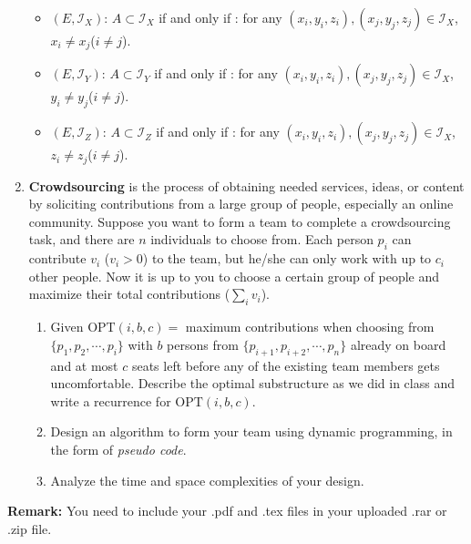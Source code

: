 \documentclass[12pt,a4paper]{article}
\theoremstyle{definition}
\begin{document}
\begin{enumerate}
	\begin{itemize}
		\item $(E, \mathcal{I}_X)$: $A \subset \mathcal{I}_X$ if and only if : for any $(x_i, y_i, z_i), (x_j, y_j, z_j) \in \mathcal{I}_X$, $x_i \neq x_j$($i \neq j$).
	\end{itemize}

	\begin{itemize}
		\item $(E, \mathcal{I}_Y)$: $A \subset \mathcal{I}_Y$ if and only if : for any $(x_i, y_i, z_i), (x_j, y_j, z_j) \in \mathcal{I}_X$, $y_i \neq y_j$($i \neq j$).
	\end{itemize}

	\begin{itemize}
		\item $(E, \mathcal{I}_Z)$: $A \subset \mathcal{I}_Z$ if and only if : for any $(x_i, y_i, z_i), (x_j, y_j, z_j) \in \mathcal{I}_X$, $z_i \neq z_j$($i \neq j$).
	\end{itemize}



	\item
	\textbf{Crowdsourcing} is the process of obtaining needed services, ideas, or content by soliciting contributions from a large group of people, especially an online community. Suppose you want to form a team to complete a crowdsourcing task, and there are $n$ individuals to choose from. Each person $p_i$ can contribute $v_i$ ($v_i > 0$) to the team, but he/she can only work with up to $c_i$ other people. Now it is up to you to choose a certain group of people and maximize their total contributions ($\sum_i{v_i}$).
	
	\begin{enumerate}
		\item Given $\text{OPT}(i, b, c)=$ maximum contributions when choosing from $\{p_1, p_2, \cdots, p_i\}$ with $b$ persons from $\{p_{i+1}, p_{i+2}, \cdots, p_n\}$ already on board and at most $c$ seats left before any of the existing team members gets uncomfortable. Describe the optimal substructure as we did in class and write a recurrence for $\text{OPT}(i, b, c)$.
		\item Design an algorithm to form your team using dynamic programming, in the form of \emph{pseudo code}.
        \item Analyze the time and space complexities of your design.
	\end{enumerate}
\end{enumerate}

\vspace{20pt}

\textbf{Remark:} You need to include your .pdf and .tex files in your uploaded .rar or .zip file.

\end{document}

